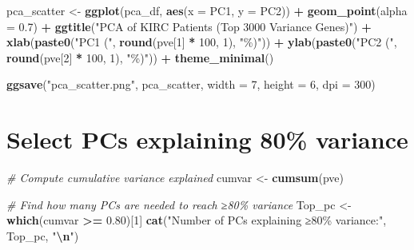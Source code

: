 \documentclass[
]{article}
\newenvironment{Shaded}{\begin{snugshade}}{\end{snugshade}}
\newcommand{\AttributeTok}[1]{\textcolor[rgb]{0.13,0.29,0.53}{#1}}
\newcommand{\CommentTok}[1]{\textcolor[rgb]{0.56,0.35,0.01}{\textit{#1}}}
\newcommand{\DecValTok}[1]{\textcolor[rgb]{0.00,0.00,0.81}{#1}}
\newcommand{\FloatTok}[1]{\textcolor[rgb]{0.00,0.00,0.81}{#1}}
\newcommand{\FunctionTok}[1]{\textcolor[rgb]{0.13,0.29,0.53}{\textbf{#1}}}
\newcommand{\NormalTok}[1]{#1}
\newcommand{\OtherTok}[1]{\textcolor[rgb]{0.56,0.35,0.01}{#1}}
\newcommand{\SpecialCharTok}[1]{\textcolor[rgb]{0.81,0.36,0.00}{\textbf{#1}}}
\newcommand{\StringTok}[1]{\textcolor[rgb]{0.31,0.60,0.02}{#1}}
\begin{document}
\begin{Shaded}
\begin{Highlighting}[]
\NormalTok{pca\_scatter }\OtherTok{\textless{}{-}} \FunctionTok{ggplot}\NormalTok{(pca\_df, }\FunctionTok{aes}\NormalTok{(}\AttributeTok{x =}\NormalTok{ PC1, }\AttributeTok{y =}\NormalTok{ PC2)) }\SpecialCharTok{+}
  \FunctionTok{geom\_point}\NormalTok{(}\AttributeTok{alpha =} \FloatTok{0.7}\NormalTok{) }\SpecialCharTok{+}
  \FunctionTok{ggtitle}\NormalTok{(}\StringTok{"PCA of KIRC Patients (Top 3000 Variance Genes)"}\NormalTok{) }\SpecialCharTok{+}
  \FunctionTok{xlab}\NormalTok{(}\FunctionTok{paste0}\NormalTok{(}\StringTok{"PC1 ("}\NormalTok{, }\FunctionTok{round}\NormalTok{(pve[}\DecValTok{1}\NormalTok{] }\SpecialCharTok{*} \DecValTok{100}\NormalTok{, }\DecValTok{1}\NormalTok{), }\StringTok{"\%)"}\NormalTok{)) }\SpecialCharTok{+}
  \FunctionTok{ylab}\NormalTok{(}\FunctionTok{paste0}\NormalTok{(}\StringTok{"PC2 ("}\NormalTok{, }\FunctionTok{round}\NormalTok{(pve[}\DecValTok{2}\NormalTok{] }\SpecialCharTok{*} \DecValTok{100}\NormalTok{, }\DecValTok{1}\NormalTok{), }\StringTok{"\%)"}\NormalTok{)) }\SpecialCharTok{+}
  \FunctionTok{theme\_minimal}\NormalTok{()}

\FunctionTok{ggsave}\NormalTok{(}\StringTok{"pca\_scatter.png"}\NormalTok{, pca\_scatter, }\AttributeTok{width =} \DecValTok{7}\NormalTok{, }\AttributeTok{height =} \DecValTok{6}\NormalTok{, }\AttributeTok{dpi =} \DecValTok{300}\NormalTok{)}
\end{Highlighting}
\end{Shaded}

\section{Select PCs explaining 80\%
variance}\label{select-pcs-explaining-80-variance}

\begin{Shaded}
\begin{Highlighting}[]
\CommentTok{\# Compute cumulative variance explained}
\NormalTok{cumvar }\OtherTok{\textless{}{-}} \FunctionTok{cumsum}\NormalTok{(pve)}

\CommentTok{\# Find how many PCs are needed to reach ≥80\% variance}
\NormalTok{Top\_pc }\OtherTok{\textless{}{-}} \FunctionTok{which}\NormalTok{(cumvar }\SpecialCharTok{\textgreater{}=} \FloatTok{0.80}\NormalTok{)[}\DecValTok{1}\NormalTok{]}
\FunctionTok{cat}\NormalTok{(}\StringTok{"Number of PCs explaining ≥80\% variance:"}\NormalTok{, Top\_pc, }\StringTok{"}\SpecialCharTok{\textbackslash{}n}\StringTok{"}\NormalTok{)}
\end{Highlighting}
\end{Shaded}
\end{document}
